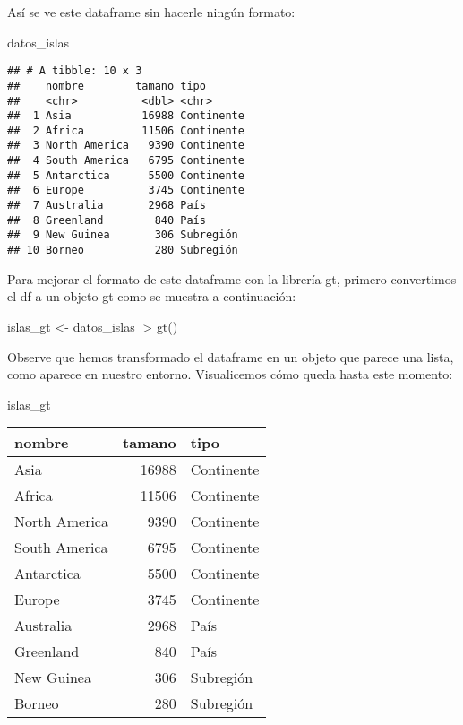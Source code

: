 \documentclass[
]{article}
\newenvironment{Shaded}{\begin{snugshade}}{\end{snugshade}}
\newcommand{\FunctionTok}[1]{\textcolor[rgb]{0.00,0.00,0.00}{#1}}
\newcommand{\NormalTok}[1]{#1}
\newcommand{\OtherTok}[1]{\textcolor[rgb]{0.56,0.35,0.01}{#1}}
\newcommand{\SpecialCharTok}[1]{\textcolor[rgb]{0.00,0.00,0.00}{#1}}
\begin{document}
Así se ve este dataframe sin hacerle ningún formato:

\begin{Shaded}
\begin{Highlighting}[]
\NormalTok{datos\_islas}
\end{Highlighting}
\end{Shaded}

\begin{verbatim}
## # A tibble: 10 x 3
##    nombre        tamano tipo      
##    <chr>          <dbl> <chr>     
##  1 Asia           16988 Continente
##  2 Africa         11506 Continente
##  3 North America   9390 Continente
##  4 South America   6795 Continente
##  5 Antarctica      5500 Continente
##  6 Europe          3745 Continente
##  7 Australia       2968 País      
##  8 Greenland        840 País      
##  9 New Guinea       306 Subregión 
## 10 Borneo           280 Subregión
\end{verbatim}

Para mejorar el formato de este dataframe con la librería gt, primero
convertimos el df a un objeto gt como se muestra a continuación:

\begin{Shaded}
\begin{Highlighting}[]
\NormalTok{islas\_gt }\OtherTok{\textless{}{-}}\NormalTok{ datos\_islas }\SpecialCharTok{|\textgreater{}} 
  \FunctionTok{gt}\NormalTok{()}
\end{Highlighting}
\end{Shaded}

Observe que hemos transformado el dataframe en un objeto que parece una
lista, como aparece en nuestro entorno. Visualicemos cómo queda hasta
este momento:

\begin{Shaded}
\begin{Highlighting}[]
\NormalTok{islas\_gt}
\end{Highlighting}
\end{Shaded}

\begin{longtable}{lrl}
\toprule
nombre & tamano & tipo \\ 
\midrule
Asia & 16988 & Continente \\ 
Africa & 11506 & Continente \\ 
North America & 9390 & Continente \\ 
South America & 6795 & Continente \\ 
Antarctica & 5500 & Continente \\ 
Europe & 3745 & Continente \\ 
Australia & 2968 & País \\ 
Greenland & 840 & País \\ 
New Guinea & 306 & Subregión \\ 
Borneo & 280 & Subregión \\ 
\bottomrule
\end{longtable}
\end{document}
